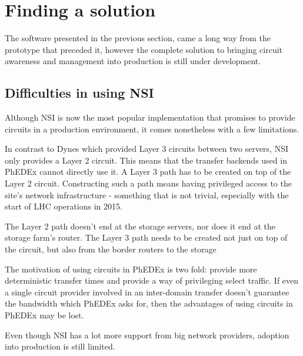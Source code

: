 \section{Finding a solution}

The software presented in the previous section, came a long way from the prototype 
that preceded it, however the complete solution to bringing circuit awareness and 
management into production is still under development.

\subsection{Difficulties in using NSI}

Although NSI is now the most popular implementation that promises to provide 
circuits in a production environment, it comes nonetheless with a few limitations.

\begin{description}[style=unboxed,leftmargin=0cm]
  \item[Provides a layer 2 circuit:] In contrast to Dynes which provided Layer 3 
  circuits between two servers, NSI only provides a Layer 2 circuit. This means that 
  the transfer backends used in PhEDEx cannot directly use it. A Layer 3 path 
  has to be created on top of the Layer 2 circuit. Constructing such a path means 
  having privileged access to the site's network infrastructure - something that is 
  not trivial, especially with the start of LHC operations in 2015.
  \item[Circuit ends at the border router:] The Layer 2 path doesn't end at the storage 
  servers, nor does it end at the storage farm's router. The Layer 3 path needs to 
  be created not just on top of the circuit, but also from the border routers to the 
  storage 
  \item[Guarantee bandwidth is not supported by all providers:] The motivation of using 
  circuits in PhEDEx is two fold: provide more deterministic transfer times and 
  provide a way of privileging select traffic. If even a single circuit provider 
  involved in an inter-domain transfer doesn't guarantee the bandwidth which PhEDEx 
  asks for, then the advantages of using circuits in PhEDEx may be lost.
  \item[NSI adoption is still limited:] Even though NSI has a lot more support from 
  big network providers, adoption into production is still limited. 
\end{description}

